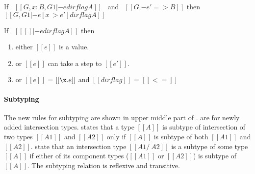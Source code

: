 \begin{lemma}[Substitution]
\label{lemma:inter:substitution}
  If \ $[[G, x:B , G1 |- e dirflag A]]$ \ and \ $[[G |- e' => B]]$
  then \ $[[G, G1 |- e [ x ~> e' ] dirflag A]]$
\end{lemma}

\begin{lemma}[Progress]
\label{lemma:inter:progress}
If \ $[[ [] |- e dirflag A]]$ then
 \begin{enumerate}
  \item either $[[e]]$ is a value.
  \item or $[[e]]$ can take a step to $[[e']]$.
  \item or $[[e]]$ = $[[\x.e]]$ and $[[dirflag]]$ = $[[<=]]$
  \end{enumerate}
\end{lemma}

\paragraph{Subtyping}
The new rules for subtyping are shown in upper middle part of
.   are for newly
added intersection types.  states that a type $[[A]]$ is
subtype of intersection of two types $[[A1]]$ and $[[A2]]$ only if
$[[A]]$ is subtype of both $[[A1]]$ and $[[A2]]$.  state that an intersection type $[[A1 /\ A2]]$ is a subtype
of some type $[[A]]$ if either of its component types ($[[A1]]$ or
$[[A2]]$) is subtype of $[[A]]$. The subtyping relation is reflexive
and transitive.
 

